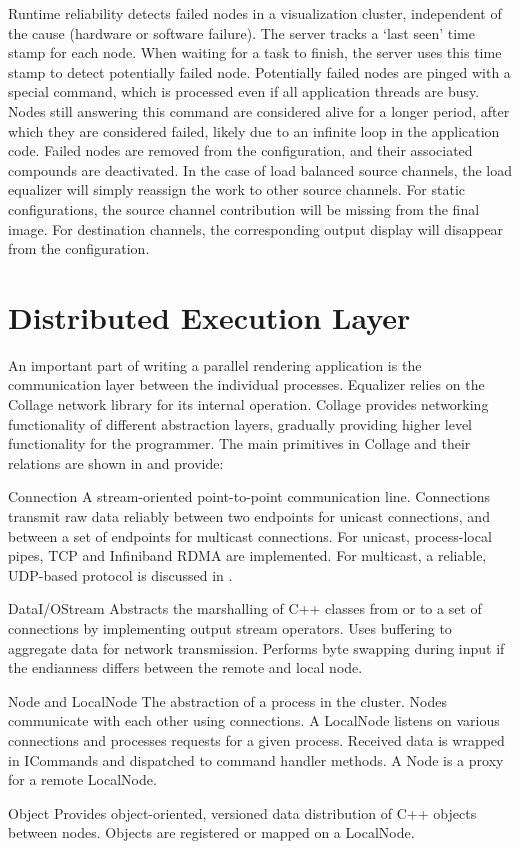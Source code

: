Runtime reliability detects failed nodes in a visualization cluster,
independent of the cause (hardware or software failure). The server tracks a
`last seen' time stamp for each node. When waiting for a task to finish, the
server uses this time stamp to detect potentially failed node. Potentially
failed nodes are pinged with a special command, which is processed even if all
application threads are busy. Nodes still answering this command are considered
alive for a longer period, after which they are considered failed, likely due
to an infinite loop in the application code. Failed nodes are removed from the
configuration, and their associated compounds are deactivated. In the case of
load balanced source channels, the load equalizer will simply reassign the work
to other source channels. For static configurations, the source channel
contribution will be missing from the final image. For destination channels,
the corresponding output display will disappear from the configuration.

\section{Distributed Execution Layer}

An important part of writing a parallel rendering application is the
communication layer between the individual processes. \textsf{Equalizer} relies
on the \textsf{Collage} network library for its internal operation.
\textsf{Collage} provides networking functionality of different abstraction
layers, gradually providing higher level functionality for the programmer. The
main primitives in \textsf{Collage} and their relations are shown in
 and provide:

\begin{compactdesc}
\item[Connection] A stream-oriented point-to-point communication
  line. Connections
  transmit raw data reliably between two endpoints for unicast connections, and
  between a set of endpoints for multicast connections. For unicast,
  process-local pipes, TCP and Infiniband RDMA are implemented. For multicast,
  a reliable, UDP-based protocol is discussed in .
\item[DataI/OStream] Abstracts the marshalling of C++ classes from or to
  a set of connections by implementing output stream operators. Uses buffering
  to aggregate data for network transmission. Performs byte swapping during
  input if the endianness differs between the remote and local node.
\item[Node and LocalNode] The abstraction of a process in the cluster. Nodes
  communicate with each other using connections. A LocalNode listens on various
  connections and processes requests for a given process. Received data is
  wrapped in ICommands and dispatched to command handler methods. A Node is a
  proxy for a remote LocalNode.
\item[Object] Provides object-oriented, versioned data distribution of C++
  objects between nodes. Objects are registered or mapped on a Local\-Node.
\end{compactdesc}

